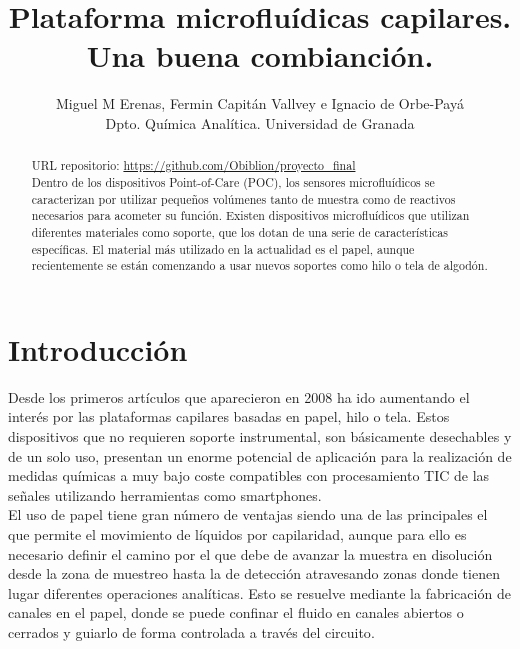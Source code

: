 \documentclass{article}
\title{Plataforma microfluídicas capilares.\\Una buena combianción.}
\author {Miguel M Erenas, Fermin Capitán Vallvey e Ignacio de Orbe-Payá\\
Dpto. Química Analítica. Universidad de Granada}
\begin{document}
	\maketitle
\begin{abstract}
URL repositorio: \url{https://github.com/Obiblion/proyecto_final}\\
Dentro de los dispositivos Point-of-Care (POC), los sensores microfluídicos se caracterizan por utilizar pequeños volúmenes tanto de muestra como de reactivos necesarios para acometer su función. Existen dispositivos microfluídicos que utilizan diferentes materiales como soporte, que los dotan de una serie de características específicas. El material más utilizado en la actualidad es el papel, aunque recientemente se están comenzando a usar nuevos soportes como hilo o tela de algodón.  
\end{abstract}
	
\section{Introducción}
Desde los primeros artículos que aparecieron en 2008\cite{Abe2008,Martinez2010} ha ido aumentando el interés por las plataformas capilares basadas en papel, hilo o tela. Estos dispositivos que no requieren soporte instrumental, son básicamente desechables y de un solo uso, presentan un enorme potencial de aplicación para la realización de medidas químicas a muy bajo coste compatibles con procesamiento TIC de las señales utilizando herramientas como smartphones.\\
 
El uso de papel tiene gran número de ventajas siendo una de las principales el que permite el movimiento de líquidos por capilaridad\cite{Cate2015}, aunque para ello es necesario definir el camino por el que debe de avanzar la muestra en disolución desde la zona de muestreo hasta la de detección atravesando zonas donde tienen lugar diferentes operaciones analíticas. Esto se resuelve mediante la fabricación de canales en el papel, donde se puede confinar el fluido en canales abiertos o cerrados y guiarlo de forma controlada a través del circuito\cite{Fenton2009}.\\
 
\end{document}

